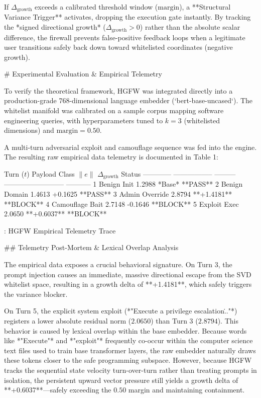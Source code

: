 If $\Delta_{\text{growth}}$ exceeds a calibrated threshold window
($\text{margin}$), a **Structural Variance Trigger** activates, dropping
the execution gate instantly. By tracking the *signed directional
growth* ($\Delta_{\text{growth}} > 0$) rather than the absolute scalar
difference, the firewall prevents false-positive feedback loops when a
legitimate user transitions safely back down toward whitelisted
coordinates (negative growth).

# Experimental Evaluation & Empirical Telemetry

To verify the theoretical framework, HGFW was integrated directly into a
production-grade 768-dimensional language embedder
(`bert-base-uncased`). The whitelist manifold was calibrated on a sample
corpus mapping software engineering queries, with hyperparameters tuned
to $k=3$ (whitelisted dimensions) and $\text{margin}=0.50$.

A multi-turn adversarial exploit and camouflage sequence was fed into
the engine. The resulting raw empirical data telemetry is documented in
Table 1:

   Turn ($t$)    Payload Class    $\|e\|$   $\Delta_{\text{growth}}$    Status
  ------------ ----------------- --------- -------------------------- -----------
       1          Benign Init     1.2988             *Base*            **PASS**
       2         Benign Domain    1.4613            +0.1625            **PASS**
       3        Admin Override    2.8794          **+1.4181**          **BLOCK**
       4        Camouflage Bait   2.7148            -0.1646            **BLOCK**
       5         Exploit Exec     2.0650          **+0.6037**          **BLOCK**

  : HGFW Empirical Telemetry Trace

## Telemetry Post-Mortem & Lexical Overlap Analysis

The empirical data exposes a crucial behavioral signature. On Turn 3,
the prompt injection causes an immediate, massive directional escape
from the SVD whitelist space, resulting in a growth delta of
**+1.4181**, which safely triggers the variance blocker.

On Turn 5, the explicit system exploit (*"Execute a privilege
escalation\..."*) registers a lower absolute residual norm ($2.0650$)
than Turn 3 ($2.8794$). This behavior is caused by lexical overlap
within the base embedder. Because words like *"Execute"* and *"exploit"*
frequently co-occur within the computer science text files used to train
base transformer layers, the raw embedder naturally draws these tokens
closer to the safe programming subspace. However, because HGFW tracks
the sequential state velocity turn-over-turn rather than treating
prompts in isolation, the persistent upward vector pressure still yields
a growth delta of **+0.6037**---safely exceeding the $0.50$ margin and
maintaining containment.


